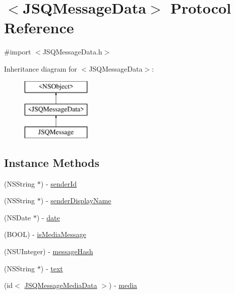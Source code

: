 \hypertarget{protocol_j_s_q_message_data-p}{}\section{$<$J\+S\+Q\+Message\+Data$>$ Protocol Reference}
\label{protocol_j_s_q_message_data-p}


{\ttfamily \#import $<$J\+S\+Q\+Message\+Data.\+h$>$}

Inheritance diagram for $<$J\+S\+Q\+Message\+Data$>$\+:\begin{figure}[H]
\begin{center}
\leavevmode
\includegraphics[height=3.000000cm]{protocol_j_s_q_message_data-p}
\end{center}
\end{figure}
\subsection*{Instance Methods}
\begin{DoxyCompactItemize}
\item 
(N\+S\+String $\ast$) -\/ \hyperlink{protocol_j_s_q_message_data-p_a0f4f995388fa2d0458677ffd8d1b5dd1}{sender\+Id}
\item 
(N\+S\+String $\ast$) -\/ \hyperlink{protocol_j_s_q_message_data-p_a190f3cca61feaf0c41300bffd02d7b50}{sender\+Display\+Name}
\item 
(N\+S\+Date $\ast$) -\/ \hyperlink{protocol_j_s_q_message_data-p_ae3945a0ff0ad424b587c2b95b37ae5aa}{date}
\item 
(B\+O\+O\+L) -\/ \hyperlink{protocol_j_s_q_message_data-p_a232fe7bc596ffa5f8d7e1c8a5b97f2a5}{is\+Media\+Message}
\item 
(N\+S\+U\+Integer) -\/ \hyperlink{protocol_j_s_q_message_data-p_a842d6be6927d4994ef1d02b1aaeb30f9}{message\+Hash}
\item 
(N\+S\+String $\ast$) -\/ \hyperlink{protocol_j_s_q_message_data-p_adbcfd3b3a39b2d8f5437c6a9459595ed}{text}
\item 
(id$<$ \hyperlink{protocol_j_s_q_message_media_data-p}{J\+S\+Q\+Message\+Media\+Data} $>$) -\/ \hyperlink{protocol_j_s_q_message_data-p_ace4b6a18782fc10ee2725418ec14a868}{media}
\end{DoxyCompactItemize}


